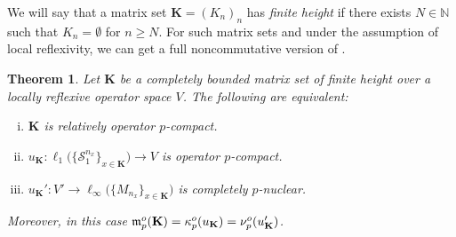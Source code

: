 \documentclass[11pt]{amsart}
\newcommand{\N}{{\mathbb{N}}}
\newtheorem{theorem}{Theorem}[section]
\numberwithin{equation}{section}
\begin{document}
We will say that a matrix set $\mathbf{K} = (K_n)_n$ has \emph{finite height}
if there exists $N\in\N$ such that $K_n = \emptyset$ for $n \ge N$.
For such matrix sets and under the assumption of local reflexivity, we can get a full noncommutative version of \cite[Prop. 3.5]{Delgado-Pineiro-Serrano-adjoints}.

\begin{theorem}\label{thm:equivalences-p-compact-j}
Let $\mathbf{K}$ be a completely bounded matrix set of finite height over a locally reflexive operator space $V$.
The following are equivalent:
\begin{enumerate}[(i)]
\item $\mathbf{K}$ is relatively operator $p$-compact.
\item $u_\mathbf{K} : \ell_1\big( \{ \mathcal{S}^{n_x}_1 \}_{x \in \mathbf{K}}\big) \to V$ is operator $p$-compact.
\item $u_{\mathbf{K}}' : V' \to \ell_\infty\big( \{M_{n_x}\}_{x \in \mathbf{K}} \big)$ is completely $p$-nuclear.
\end{enumerate}
Moreover, in this case $\frak m_p^o(\mathbf{K}) = \kappa_p^o(u_\mathbf{K})=\nu_p^o(u_\mathbf{K}')$.
\end{theorem}
\end{document}
